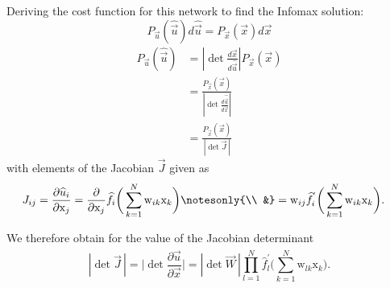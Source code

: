 \begin{frame}

Deriving the cost function for this network to find the Infomax solution:
\begin{equation}
\label{eq:conservationvec}
	P_{\vec{u}} (\widehat{\vec{u}}) d \widehat{\vec{u}}
		= P_{\vec{x}}(\vec{x}) d \vec{x}
\end{equation}
\begin{align}
\label{eq:uxj}
	P_{\vec{u}} (\widehat{\vec{u}}) 
	& = \left| \det \frac{d \vec{x}}{d \widehat{\vec{u}}} \right|
		P_{\vec{x}}(\vec{x}) \\
	& = \frac{P_{\vec{x}}(\vec{x})}{ \left| \det
		\frac{d \widehat{\vec{u}}}{d \vec{x}} \right|}\\
    & = \frac{P_{\vec{x}}(\vec{x})}{|\det \vec{J}\,|}
\end{align}
with elements of the Jacobian $\vec J$ given as
\slidesonly{
	\begingroup
	\small
}
\begin{align}
\label{eq:jacobelement}
 J_{ij}=
 \frac{\partial \widehat{u}_i}{\partial \mathrm{x}_j}
	& = \frac{\partial}{\partial \mathrm{x}_j} 
		\widehat{f}_i \bigg( \sum\limits_{k = 1}^N \mathrm{w}_{ik} 
		\mathrm{x}_k \bigg) \notesonly{\\
	&} = \mathrm{w}_{ij} \widehat{f}_i^{'} \bigg( \sum\limits_{k = 1}^N 
		\mathrm{w}_{ik} \mathrm{x}_k \bigg).
\end{align}
\slidesonly{
	\endgroup
}

We therefore obtain for the value of the Jacobian determinant
\slidesonly{
	\begingroup
	\footnotesize
}
\begin{equation} \label{eq:functionalDeterminant}
|\det \vec {J}\,| = 
	\Big| \det \frac{\partial \widehat{\vec{u}}}{\partial \vec{x}} \Big|
	= |\det \vec{W}\, | \prod\limits_{l = 1}^N  \widehat{f}_l^{'} \Bigg( 
		\sum\limits_{k = 1}^N \mathrm{w}_{lk} \mathrm{x}_k \Bigg).
\end{equation}
\slidesonly{
	\endgroup
}

\end{frame}

\clearpage

